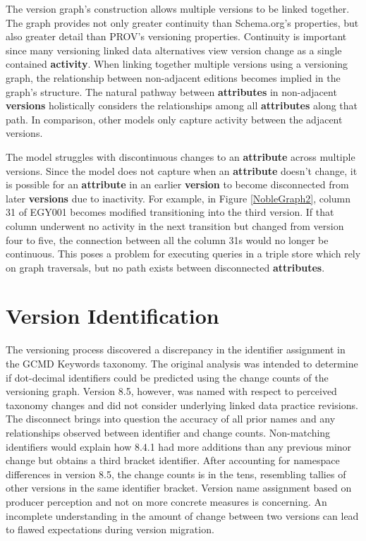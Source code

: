 The version graph's construction allows multiple versions to be linked together.
The graph provides not only greater continuity than Schema.org's properties, but also greater detail than PROV's versioning properties.
Continuity is important since many versioning linked data alternatives view version change as a single contained \textbf{activity}.
When linking together multiple versions using a versioning graph, the relationship between non-adjacent editions becomes implied in the graph's structure.
The natural pathway between \textbf{attributes} in non-adjacent \textbf{versions} holistically considers the relationships among all \textbf{attributes} along that path.
In comparison, other models only capture activity between the adjacent versions.

The model struggles with discontinuous changes to an \textbf{attribute} across multiple versions.
Since the model does not capture when an \textbf{attribute} doesn't change, it is possible for an \textbf{attribute} in an earlier \textbf{version} to become disconnected from later \textbf{versions} due to inactivity.
For example, in Figure \ref{NobleGraph2}, column 31 of EGY001 becomes modified transitioning into the third version.
If that column underwent no activity in the next transition but changed from version four to five, the connection between all the column 31s would no longer be continuous.
This poses a problem for executing queries in a triple store which rely on graph traversals, but no path exists between disconnected \textbf{attributes}.

\section{Version Identification}

The versioning process discovered a discrepancy in the identifier assignment in the GCMD Keywords taxonomy.
The original analysis was intended to determine if dot-decimal identifiers could be predicted using the change counts of the versioning graph.
Version 8.5, however, was named with respect to perceived taxonomy changes and did not consider underlying linked data practice revisions.
The disconnect brings into question the accuracy of all prior names and any relationships observed between identifier and change counts.
Non-matching identifiers would explain how 8.4.1 had more additions than any previous minor change but obtains a third bracket identifier.
After accounting for namespace differences in version 8.5, the change counts is in the tens, resembling tallies of other versions in the same identifier bracket.
Version name assignment based on producer perception and not on more concrete measures is concerning.
An incomplete understanding in the amount of change between two versions can lead to flawed expectations during version migration.

